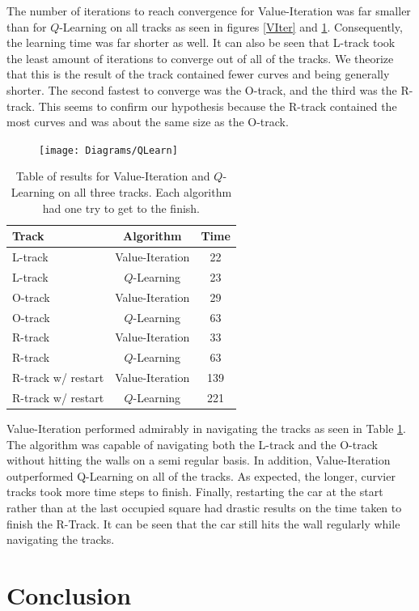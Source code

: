 \documentclass{article}
\begin{document}
				The number of iterations to reach convergence for Value-Iteration was far smaller than for $Q$-Learning on all tracks as seen in figures \ref{VIter} and \ref{QLearn}. Consequently, the learning time was far shorter as well. It can also be seen that L-track took the least amount of iterations to converge out of all of the tracks. We theorize that this is the result of the track contained fewer curves and being generally shorter. The second fastest to converge was the O-track, and the third was the R-track. This seems to confirm our hypothesis because the R-track contained the most curves and was about the same size as the O-track.

				
				
				
				\begin{figure}[h!]
					\centering
					\texttt{[image: Diagrams/QLearn]}
					\caption{}
					\label{QLearn}
				\end{figure}
				
				\begin{table}
					\centering
					\begin{tabular}{|l|c|c|}
						\hline
						Track & Algorithm & Time \\ \hline
						L-track & Value-Iteration & 22 \\ 
						L-track & $Q$-Learning & 23 \\ 
						O-track & Value-Iteration & 29 \\
						O-track & $Q$-Learning & 63 \\
						R-track & Value-Iteration & 33 \\
						R-track & $Q$-Learning & 63 \\
						R-track w/ restart & Value-Iteration & 139\\
						R-track w/ restart & $Q$-Learning & 221  \\ \hline
						
					\end{tabular}
					\caption{Table of results for Value-Iteration and $Q$-Learning on all three tracks. Each algorithm had one try to get to the finish.}
					\label{results}
				\end{table}
				
				Value-Iteration performed admirably in navigating the tracks as seen in Table \ref{results}. The algorithm was capable of navigating both the L-track and the O-track without hitting the walls on a semi regular basis. In addition, Value-Iteration outperformed Q-Learning on all of the tracks. As expected, the longer, curvier tracks took more time steps to finish. Finally, restarting the car at the start rather than at the last occupied square had drastic results on the time taken to finish the R-Track. It can be seen that the car still hits the wall regularly while navigating the tracks.


	\section{Conclusion}


		
	
\end{document}
